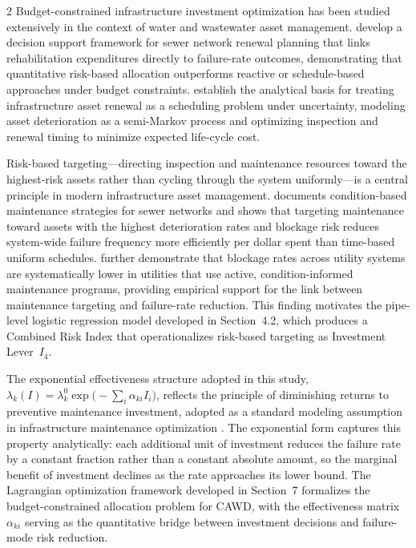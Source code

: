 \documentclass[10pt]{article}
\begin{document}
\begin{multicols}{2}
Budget-constrained infrastructure investment optimization has been studied
extensively in the context of water and wastewater asset management.
\citet{halfawy2008} develop a decision support framework for sewer network
renewal planning that links rehabilitation expenditures directly to
failure-rate outcomes, demonstrating that quantitative risk-based allocation
outperforms reactive or schedule-based approaches under budget constraints.
\citet{kleiner2001} establish the analytical basis for treating
infrastructure asset renewal as a scheduling problem under uncertainty,
modeling asset deterioration as a semi-Markov process and optimizing
inspection and renewal timing to minimize expected life-cycle cost.
 
Risk-based targeting---directing inspection and maintenance resources toward
the highest-risk assets rather than cycling through the system
uniformly---is a central principle in modern infrastructure asset
management. \citet{saegrov2006} documents condition-based maintenance
strategies for sewer networks and shows that targeting maintenance toward
assets with the highest deterioration rates and blockage risk reduces
system-wide failure frequency more efficiently per dollar spent than
time-based uniform schedules. \citet{marlow2011} further demonstrate that
blockage rates across utility systems are systematically lower in utilities
that use active, condition-informed maintenance programs, providing
empirical support for the link between maintenance targeting and
failure-rate reduction. This finding motivates the pipe-level logistic
regression model developed in Section~4.2, which produces a Combined Risk
Index that operationalizes risk-based targeting as Investment Lever~$I_4$.
 
The exponential effectiveness structure adopted in this study,
$\lambda_k(I) = \lambda_k^0 \exp\!\bigl(-\sum_i \alpha_{ki} I_i\bigr)$,
reflects the principle of diminishing returns to preventive maintenance
investment, adopted as a standard modeling assumption in infrastructure
maintenance optimization \citep{halfawy2008,kleiner2001}. The exponential
form captures this property analytically: each additional unit of
investment reduces the failure rate by a constant fraction rather than a
constant absolute amount, so the marginal benefit of investment declines
as the rate approaches its lower bound. The Lagrangian optimization
framework developed in Section~7 formalizes the budget-constrained
allocation problem for CAWD, with the effectiveness matrix $\alpha_{ki}$
serving as the quantitative bridge between investment decisions and
failure-mode risk reduction.



\end{multicols}
\end{document}
